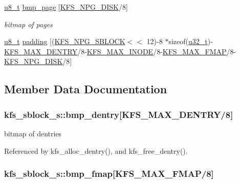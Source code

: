 \begin{DoxyCompactItemize}
\hyperlink{kfs_8c_ae081489b4906f65a3cb18e9fbe9f8d23}{u8\-\_\-t} \hyperlink{structkfs__sblock__s_a163e19c03f2551155f6b94c304103da3}{bmp\-\_\-page} \mbox{[}\hyperlink{kfs_8h_a7c0f2945d18d92bc9b2e754b377335b3}{K\-F\-S\-\_\-\-N\-P\-G\-\_\-\-D\-I\-S\-K}/8\mbox{]}
\begin{DoxyCompactList}\small\item\em bitmap of pages \end{DoxyCompactList}\item 
\hyperlink{kfs_8c_ae081489b4906f65a3cb18e9fbe9f8d23}{u8\-\_\-t} \hyperlink{structkfs__sblock__s_acb2d63ab6c4b6bfb0bbd4273fbb3864d}{padding} \mbox{[}(\hyperlink{kfs_8h_a82f61eaff20e7015c52261a2423ab0af}{K\-F\-S\-\_\-\-N\-P\-G\-\_\-\-S\-B\-L\-O\-C\-K}$<$$<$ 12)-\/8 $\ast$sizeof(\hyperlink{kfs_8c_a0c0a490ab7fa397be6c764a935cc5ea4}{u32\-\_\-t})-\/\hyperlink{kfs_8c_a92ab7d744c9853bdebee5c81ac2b422f}{K\-F\-S\-\_\-\-M\-A\-X\-\_\-\-D\-E\-N\-T\-R\-Y}/8-\/\hyperlink{kfs_8c_ac084ea319e447d4af876044655fc46ec}{K\-F\-S\-\_\-\-M\-A\-X\-\_\-\-I\-N\-O\-D\-E}/8-\/\hyperlink{kfs_8c_a75563572783e6a8183fe1fa127b6453d}{K\-F\-S\-\_\-\-M\-A\-X\-\_\-\-F\-M\-A\-P}/8-\/\hyperlink{kfs_8h_a7c0f2945d18d92bc9b2e754b377335b3}{K\-F\-S\-\_\-\-N\-P\-G\-\_\-\-D\-I\-S\-K}/8\mbox{]}
\end{DoxyCompactItemize}


\subsection{Member Data Documentation}
\hypertarget{structkfs__sblock__s_a7aa2f7b977d0648b2cbe5b1cdb3234fd}{
\subsubsection[{bmp\-\_\-dentry}]{ kfs\-\_\-sblock\-\_\-s\-::bmp\-\_\-dentry\mbox{[}{\bf K\-F\-S\-\_\-\-M\-A\-X\-\_\-\-D\-E\-N\-T\-R\-Y}/8\mbox{]}}}\label{structkfs__sblock__s_a7aa2f7b977d0648b2cbe5b1cdb3234fd}


bitmap of dentries 



Referenced by kfs\-\_\-alloc\-\_\-dentry(), and kfs\-\_\-free\-\_\-dentry().

\hypertarget{structkfs__sblock__s_a2f9dba6f80a4fc818bbe8ca84c2d1309}{
\subsubsection[{bmp\-\_\-fmap}]{ kfs\-\_\-sblock\-\_\-s\-::bmp\-\_\-fmap\mbox{[}{\bf K\-F\-S\-\_\-\-M\-A\-X\-\_\-\-F\-M\-A\-P}/8\mbox{]}}}\label{structkfs__sblock__s_a2f9dba6f80a4fc818bbe8ca84c2d1309}


